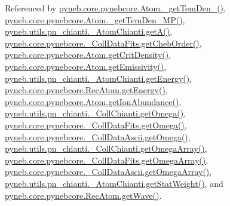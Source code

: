 Referenced by \hyperlink{pynebcore_8py_source_l01803}{pyneb.\+core.\+pynebcore.\+Atom.\+\_\+get\+Tem\+Den\+\_()}, \hyperlink{pynebcore_8py_source_l01980}{pyneb.\+core.\+pynebcore.\+Atom.\+\_\+get\+Tem\+Den\+\_\+\+M\+P()}, \hyperlink{pn__chianti_8py_source_l00296}{pyneb.\+utils.\+pn\+\_\+chianti.\+\_\+\+Atom\+Chianti.\+get\+A()}, \hyperlink{pynebcore_8py_source_l00694}{pyneb.\+core.\+pynebcore.\+\_\+\+Coll\+Data\+Fits.\+get\+Cheb\+Order()}, \hyperlink{pynebcore_8py_source_l01693}{pyneb.\+core.\+pynebcore.\+Atom.\+get\+Crit\+Density()}, \hyperlink{pynebcore_8py_source_l01716}{pyneb.\+core.\+pynebcore.\+Atom.\+get\+Emissivity()}, \hyperlink{pn__chianti_8py_source_l00346}{pyneb.\+utils.\+pn\+\_\+chianti.\+\_\+\+Atom\+Chianti.\+get\+Energy()}, \hyperlink{pynebcore_8py_source_l02811}{pyneb.\+core.\+pynebcore.\+Rec\+Atom.\+get\+Energy()}, \hyperlink{pynebcore_8py_source_l02110}{pyneb.\+core.\+pynebcore.\+Atom.\+get\+Ion\+Abundance()}, \hyperlink{pn__chianti_8py_source_l00484}{pyneb.\+utils.\+pn\+\_\+chianti.\+\_\+\+Coll\+Chianti.\+get\+Omega()}, \hyperlink{pynebcore_8py_source_l00811}{pyneb.\+core.\+pynebcore.\+\_\+\+Coll\+Data\+Fits.\+get\+Omega()}, \hyperlink{pynebcore_8py_source_l01063}{pyneb.\+core.\+pynebcore.\+\_\+\+Coll\+Data\+Ascii.\+get\+Omega()}, \hyperlink{pn__chianti_8py_source_l00461}{pyneb.\+utils.\+pn\+\_\+chianti.\+\_\+\+Coll\+Chianti.\+get\+Omega\+Array()}, \hyperlink{pynebcore_8py_source_l00783}{pyneb.\+core.\+pynebcore.\+\_\+\+Coll\+Data\+Fits.\+get\+Omega\+Array()}, \hyperlink{pynebcore_8py_source_l01039}{pyneb.\+core.\+pynebcore.\+\_\+\+Coll\+Data\+Ascii.\+get\+Omega\+Array()}, \hyperlink{pn__chianti_8py_source_l00323}{pyneb.\+utils.\+pn\+\_\+chianti.\+\_\+\+Atom\+Chianti.\+get\+Stat\+Weight()}, and \hyperlink{pynebcore_8py_source_l02623}{pyneb.\+core.\+pynebcore.\+Rec\+Atom.\+get\+Wave()}.


